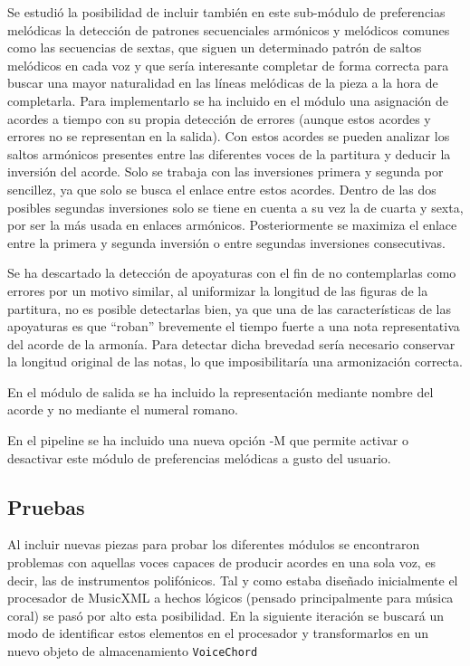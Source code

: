 Se estudió la posibilidad de incluir también en este sub-módulo de preferencias melódicas la detección de patrones secuenciales armónicos y melódicos comunes como las secuencias de sextas, que siguen un determinado patrón de saltos melódicos en cada voz y que sería interesante completar de forma correcta para buscar una mayor naturalidad en las líneas melódicas de la pieza a la hora de completarla. Para implementarlo se ha incluido en el módulo una asignación de acordes a tiempo con su propia detección de errores (aunque estos acordes y errores no se representan en la salida). Con estos acordes se pueden analizar los saltos armónicos presentes entre las diferentes voces de la partitura y deducir la inversión del acorde. Solo se trabaja con las inversiones primera y segunda por sencillez, ya que solo se busca el enlace entre estos acordes. Dentro de las dos posibles segundas inversiones solo se tiene en cuenta a su vez la  de cuarta y sexta, por ser la más usada en enlaces armónicos. Posteriormente se maximiza el enlace entre la primera y segunda inversión o entre segundas inversiones consecutivas.

Se ha descartado la detección de apoyaturas con el fin de no contemplarlas como errores por un motivo similar, al uniformizar la longitud de las figuras de la partitura, no es posible detectarlas bien, ya que una de las características de las apoyaturas es que ``roban'' brevemente el tiempo fuerte a una nota representativa del acorde de la armonía. Para detectar dicha brevedad sería necesario conservar la longitud original de las notas, lo que imposibilitaría una armonización correcta.

En el módulo de salida se ha incluido la representación mediante nombre del acorde y no mediante el numeral romano.

En el pipeline se ha incluido una nueva opción -M que permite activar o desactivar este módulo de preferencias melódicas a gusto del usuario. 

\subsection{Pruebas}
Al incluir nuevas piezas para probar los diferentes módulos se encontraron problemas con aquellas voces capaces de producir acordes en una sola voz, es decir, las de instrumentos polifónicos. Tal y como estaba diseñado inicialmente el procesador de MusicXML a hechos lógicos (pensado principalmente para música coral) se pasó por alto esta posibilidad. En la siguiente iteración se buscará un modo de identificar estos elementos en el procesador y transformarlos en un nuevo objeto de almacenamiento \texttt{VoiceChord}

